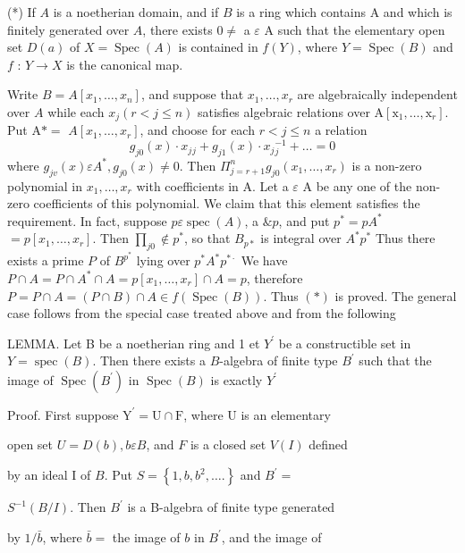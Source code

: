 (*) If $A$ is a noetherian domain, and if $B$ is a ring which contains A and which is finitely generated over $A$, there exists $0 \neq$ a $\varepsilon$ A such that the elementary open set $D(a)$ of $X=\operatorname{Spec}(A)$ is contained in $f(Y)$, where $Y=\operatorname{Spec}(B)$ and $f$ : $Y \rightarrow X$ is the canonical map.

Write $B=A\left[x_{1}, \ldots, x_{n}\right]$, and suppose that $x_{1}, \ldots, x_{r}$ are algebraically independent over $A$ while each $x_{j}(r<j \leqslant n)$ satisfies algebraic relations over $\mathrm{A}\left[\mathrm{x}_{1}, \ldots, \mathrm{x}_{r}\right]$. Put $\mathrm{A} *=$ $A\left[x_{1}, \ldots, x_{r}\right]$, and choose for each $r<j \leqslant n$ a relation
$$
g_{j 0}(x) \cdot x_{j}{ }_{j}+g_{j 1}(x) \cdot x_{j}{ }_{j}^{-1}+\ldots=0
$$
where $g_{j v}(x) \varepsilon A^{*}, g_{j 0}(x) \neq 0$. Then $\Pi_{j=r+1}^{n} g_{j 0}\left(x_{1}, \ldots, x_{r}\right)$ is a non-zero polynomial in $x_{1}, \ldots, x_{r}$ with coefficients in A. Let a $\varepsilon$ A be any one of the non-zero coefficients of this polynomial. We claim that this element satisfies the requirement. In fact, suppose $p \varepsilon \operatorname{spec}(A)$, a $\& p$, and put $p^{*}=p A^{*}$ $=p\left[x_{1}, \ldots, x_{r}\right]$. Then $\prod_{j 0} \notin p^{*}$, so that $B_{p *}$ is integral over $A^{*} p^{*}$ Thus there exists a prime $P$ of $B^{p^{*}}$ lying over $p^{*} A^{*} p^{* \cdot}$ We have $P \cap A=P \cap A^{*} \cap A=p\left[x_{1}, \ldots, x_{r}\right] \cap A=p$, therefore $P=P \cap A=(P \cap B) \cap A \in f(\operatorname{Spec}(B))$. Thus $(*)$ is proved. The general case follows from the special case treated above and from the following

LEMMA. Let B be a noetherian ring and 1 et $Y^{\prime}$ be a constructible set in $Y=\operatorname{spec}(B)$. Then there exists a $B$-algebra of finite type $B^{\prime}$ such that the image of $\operatorname{Spec}\left(B^{\prime}\right)$ in $\operatorname{Spec}(B)$ is exactly $Y^{\prime}$

Proof. First suppose $\mathrm{Y}^{\prime}=\mathrm{U} \cap \mathrm{F}$, where $\mathrm{U}$ is an elementary

open set $U=D(b), b \varepsilon B$, and $F$ is a closed set $V(I)$ defined

by an ideal I of $B .$ Put $S=\left\{1, b, b^{2}, \ldots .\right\}$ and $B^{\prime}=$

$S^{-1}(B / I)$. Then $B^{\prime}$ is a B-algebra of finite type generated

by $1 / \bar{b}$, where $\bar{b}=$ the image of $b$ in $B^{\prime}$, and the image of

